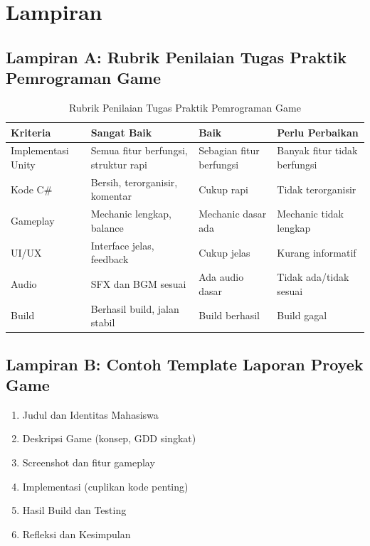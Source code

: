 \chapter*{Lampiran}

\section*{Lampiran A: Rubrik Penilaian Tugas Praktik Pemrograman Game}

\begin{table}[h]
\centering
\small
\begin{tabular}{|>{\raggedright\arraybackslash}p{3cm}|>{\raggedright\arraybackslash}p{3.5cm}|>{\raggedright\arraybackslash}p{3.5cm}|>{\raggedright\arraybackslash}p{3.5cm}|}
\hline
\textbf{Kriteria} & \textbf{Sangat Baik} & \textbf{Baik} & \textbf{Perlu Perbaikan} \\
\hline
Implementasi Unity & Semua fitur berfungsi, struktur rapi & Sebagian fitur berfungsi & Banyak fitur tidak berfungsi \\
\hline
Kode C\# & Bersih, terorganisir, komentar & Cukup rapi & Tidak terorganisir \\
\hline
Gameplay & Mechanic lengkap, balance & Mechanic dasar ada & Mechanic tidak lengkap \\
\hline
UI/UX & Interface jelas, feedback & Cukup jelas & Kurang informatif \\
\hline
Audio & SFX dan BGM sesuai & Ada audio dasar & Tidak ada/tidak sesuai \\
\hline
Build & Berhasil build, jalan stabil & Build berhasil & Build gagal \\
\hline
\end{tabular}
\caption{Rubrik Penilaian Tugas Praktik Pemrograman Game}
\end{table}

\section*{Lampiran B: Contoh Template Laporan Proyek Game}
\begin{enumerate}
  \item Judul dan Identitas Mahasiswa
  \item Deskripsi Game (konsep, GDD singkat)
  \item Screenshot dan fitur gameplay
  \item Implementasi (cuplikan kode penting)
  \item Hasil Build dan Testing
  \item Refleksi dan Kesimpulan
\end{enumerate}

